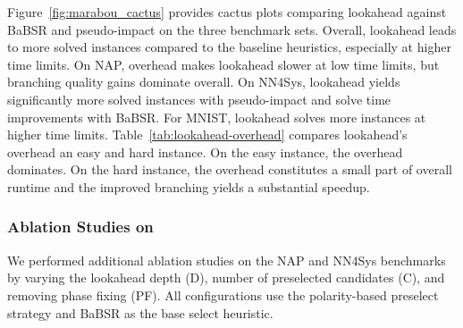 \documentclass{article}
\begin{document}
Figure~\ref{fig:marabou_cactus} provides cactus plots comparing lookahead against BaBSR and pseudo-impact on the three benchmark sets. Overall, lookahead leads to more solved instances compared to the baseline heuristics, especially at higher time limits. On NAP, overhead makes lookahead slower at low time limits, but branching quality gains dominate overall. On NN4Sys, lookahead yields significantly more solved instances with pseudo-impact and solve time improvements with BaBSR. For MNIST, lookahead solves more instances at higher time limits. Table~\ref{tab:lookahead-overhead} compares lookahead's overhead an easy and hard instance. On the easy instance, the overhead dominates. On the hard instance, the overhead constitutes a small part of overall runtime and the improved branching yields a substantial speedup.

\begin{table}[h]
\centering
\setlength{\tabcolsep}{3pt}
\renewcommand{\arraystretch}{1.2}
\caption{Lookahead overhead on easy vs.\ hard instances, time in seconds.}
\label{tab:lookahead-overhead}
\end{table}

\subsubsection{Ablation Studies on \marabou}\label{sec:marabou_ablation}

We performed additional ablation studies on the NAP and NN4Sys benchmarks by varying the lookahead depth (D), number of preselected candidates (C), and removing phase fixing (PF). All configurations use the polarity-based preselect strategy and BaBSR as the base select heuristic.
\end{document}
